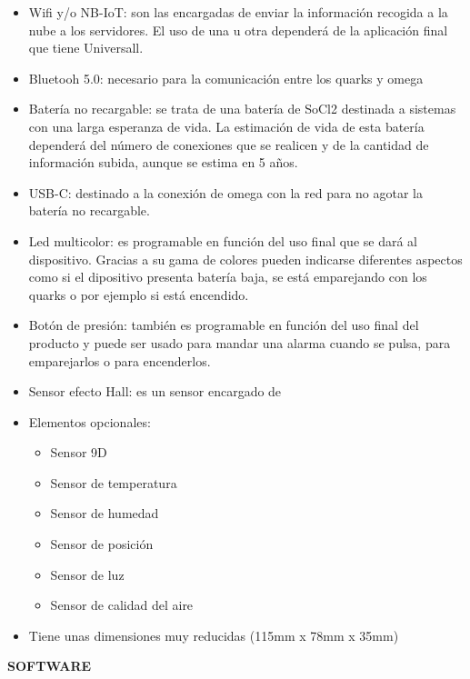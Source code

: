 \begin{itemize}
\item Wifi y/o NB-IoT: son las encargadas de enviar la información recogida a la nube a los servidores. El uso de una u otra dependerá de la aplicación final que tiene Universall.
\item Bluetooh 5.0:  necesario para la comunicación entre los quarks y omega
\item Batería no recargable: se trata de una batería de SoCl2 destinada a sistemas con una larga esperanza de vida. La estimación de vida de esta batería dependerá del número de conexiones que se realicen y de la cantidad de información subida, aunque se estima en 5 años.
\item USB-C: destinado a la conexión de omega con la red para no agotar la batería no recargable. 
\item Led multicolor: es programable en función del uso final que se dará al dispositivo. Gracias a su gama de colores pueden indicarse diferentes aspectos como si el dipositivo presenta batería baja, se está emparejando con los quarks o por ejemplo si está encendido.
\item Botón de presión: también es programable en función del uso final del producto y puede ser usado para mandar una alarma cuando se pulsa, para emparejarlos o para encenderlos.
\item Sensor efecto Hall: es un sensor encargado de 
\item Elementos opcionales:
\begin{itemize}
\item Sensor 9D
\item Sensor de temperatura
\item Sensor de humedad
\item Sensor de posición
\item Sensor de luz
\item Sensor de calidad del aire
\end{itemize}
\item Tiene unas dimensiones muy reducidas (115mm x 78mm x 35mm) 
\end{itemize}

\textbf{SOFTWARE}



